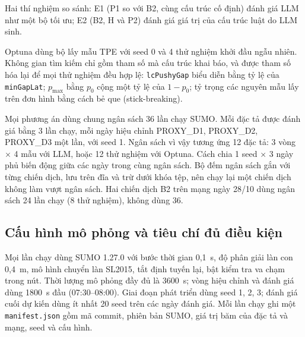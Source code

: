 \documentclass[../main.tex]{subfiles}
\begin{document}
Hai thí nghiệm so sánh: E1 (P1 so với B2, cùng cấu trúc cố định) đánh giá LLM như một bộ tối ưu; E2 (B2, H và P2) đánh giá giá trị của cấu trúc luật do LLM sinh.

Optuna dùng bộ lấy mẫu TPE với seed 0 và 4 thử nghiệm khởi đầu ngẫu nhiên. Không gian tìm kiếm chỉ gồm tham số mà cấu trúc khai báo, và được tham số hóa lại để mọi thử nghiệm đều hợp lệ: \texttt{lcPushyGap} biểu diễn bằng tỷ lệ của \texttt{minGapLat}; $p_{\max}$ bằng $p_0$ cộng một tỷ lệ của $1-p_0$; tỷ trọng các nguyên mẫu lấy trên đơn hình bằng cách bẻ que (stick-breaking).

Mọi phương án dùng chung ngân sách 36 lần chạy SUMO. Mỗi đặc tả được đánh giá bằng 3 lần chạy, mỗi ngày hiệu chỉnh PROXY\_D1, PROXY\_D2, PROXY\_D3 một lần, với seed 1. Ngân sách vì vậy tương ứng 12 đặc tả: 3 vòng $\times$ 4 mẫu với LLM, hoặc 12 thử nghiệm với Optuna. Cách chia 1 seed $\times$ 3 ngày phủ biến động giữa các ngày trong cùng ngân sách. Bộ đếm ngân sách gắn với từng chiến dịch, lưu trên đĩa và trừ dưới khóa tệp, nên chạy lại một chiến dịch không làm vượt ngân sách. Hai chiến dịch B2 trên mạng ngày 28/10 dùng ngân sách 24 lần chạy (8 thử nghiệm), không dùng 36.

\subsection{Cấu hình mô phỏng và tiêu chí đủ điều kiện}

Mọi lần chạy dùng SUMO 1.27.0 với bước thời gian 0,1~s, độ phân giải làn con 0,4~m, mô hình chuyển làn SL2015, tắt định tuyến lại, bật kiểm tra va chạm trong nút. Thời lượng mô phỏng đầy đủ là 3600~s; vòng hiệu chỉnh và đánh giá dùng 1800~s đầu (07:30--08:00). Giai đoạn phát triển dùng seed 1, 2, 3; đánh giá cuối dự kiến dùng ít nhất 20 seed trên các ngày đánh giá. Mỗi lần chạy ghi một \texttt{manifest.json} gồm mã commit, phiên bản SUMO, giá trị băm của đặc tả và mạng, seed và cấu hình.
\end{document}

